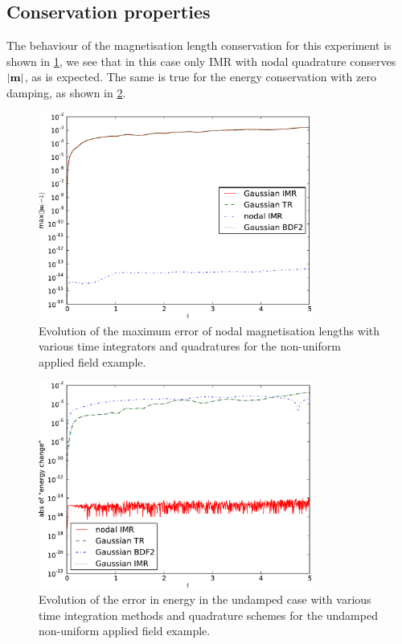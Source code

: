 

\subsection{Conservation properties}


The behaviour of the magnetisation length conservation for this experiment is shown in \cref{fig:nonuniform-h-ml-error}, we see that in this case only IMR with nodal quadrature conserves $\left|{\boldsymbol{\mathrm{m}}} \right|$, as is expected.
The same is true for the energy conservation with zero damping, as shown in \cref{fig:nonuniform-h-energy-error}.

\begin{figure}
  \centering
  \includegraphics[width=0.8\textwidth]
  {plots/nonuniform-h-ml/mlengtherrormaxesvstimes.pdf}
  \caption{Evolution of the maximum error of nodal magnetisation lengths with various time integrators and quadratures for the non-uniform applied field example.}
  \label{fig:nonuniform-h-ml-error}
\end{figure}


\begin{figure}
  \centering
  \includegraphics[width=0.8\textwidth]
  {plots/nonuniform-h-energy-change/absofenergychangevstimes.pdf}
  \caption{Evolution of the error in energy in the undamped case with various time integration methods and quadrature schemes for the undamped non-uniform applied field example.}
  \label{fig:nonuniform-h-energy-error}
\end{figure}





